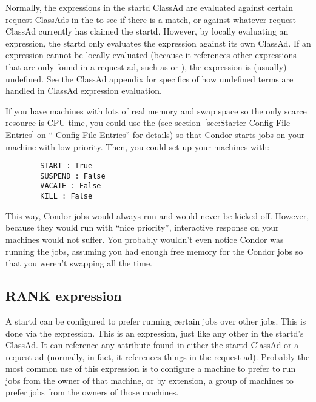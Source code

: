 Normally, the expressions in the startd ClassAd are evaluated against
certain request ClassAds in the  to see if there is
a match, or against whatever request ClassAd currently has claimed the
startd.  However, by locally evaluating an expression, the startd only
evaluates the expression against its own ClassAd.  If an expression
cannot be locally evaluated (because it references other expressions
that are only found in a request ad, such as  or
), the expression is (usually) undefined.  See the
ClassAd appendix for specifics of how undefined terms are handled in
ClassAd expression evaluation.

\Note If you have machines with lots of real memory and swap space so
  the only scarce resource is CPU time, you could use the
   (see
  section~\ref{sec:Starter-Config-File-Entries} on ``
  Config File Entries'' for details) so that Condor starts jobs on
  your machine with low priority.  Then, you could set
  up your machines with:

\begin{verbatim}
        START : True
        SUSPEND : False
        VACATE : False
        KILL : False
\end{verbatim}
  
  This way, Condor jobs would always run and would never be kicked
  off.  However, because they would run with ``nice priority'',
  interactive response on your machines would not suffer.  You
  probably wouldn't even notice Condor was running the jobs, assuming
  you had enough free memory for the Condor jobs so that you weren't
  swapping all the time.

\subsection{ RANK expression}
\label{sec:Rank-Expression}

A startd can be configured to prefer running certain jobs over other
jobs.  This is done via the  expression.  This is an
expression, just like any other in the startd's ClassAd.  It can
reference any attribute found in either the startd ClassAd or a
request ad (normally, in fact, it references things in the request
ad).  Probably the most common use of this expression is to configure a
machine to prefer to run jobs from the owner of that machine, or by
extension, a group of machines to prefer jobs from the owners of those
machines.  

